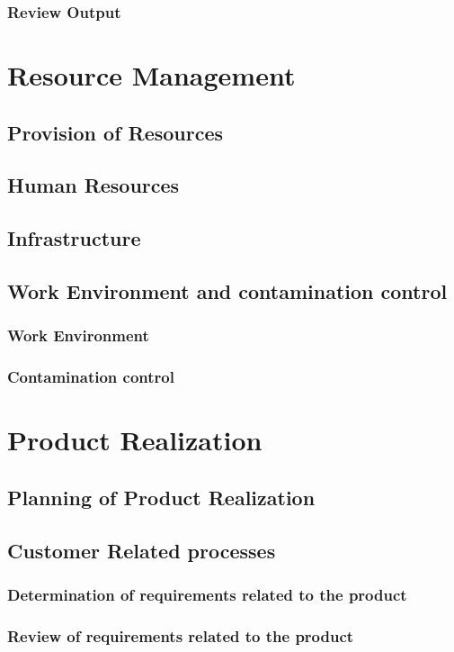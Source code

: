\documentclass{article}
\begin{document}
\subsubsection{Review Output}
\section{Resource Management}
\subsection{Provision of Resources}
\subsection{Human Resources}
\subsection{Infrastructure}
\subsection{Work Environment and contamination control}
\subsubsection{Work Environment}
\subsubsection{Contamination control}
\section{Product Realization}
\subsection{Planning of Product Realization}
\subsection{Customer Related processes}
\subsubsection{Determination of requirements related to the product}
\subsubsection{Review of requirements related to the product}
\end{document}
